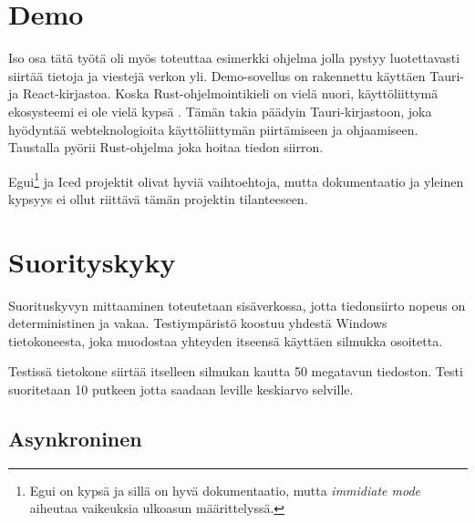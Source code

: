 \documentclass[a4paper,12pt]{article}
\begin{document}
    \section{Demo}\label{sec:demo}
    Iso osa tätä työtä oli myös toteuttaa esimerkki ohjelma jolla pystyy luotettavasti siirtää tietoja ja viestejä verkon yli. Demo-sovellus on rakennettu käyttäen Tauri- ja React-kirjastoa. Koska Rust-ohjelmointikieli on vielä nuori, käyttöliittymä ekosysteemi ei ole vielä kypsä \cite{AreYet}. Tämän takia päädyin Tauri-kirjastoon, joka hyödyntää webteknologioita käyttöliittymän piirtämiseen ja ohjaamiseen. Taustalla pyörii Rust-ohjelma joka hoitaa tiedon siirron. \par
    Egui\footnote{Egui on kypsä ja sillä on hyvä dokumentaatio, mutta \textit{immidiate mode} aiheutaa vaikeuksia ulkoasun määrittelyssä. } ja Iced projektit olivat hyviä vaihtoehtoja, mutta dokumentaatio ja yleinen kypsyys ei ollut riittävä tämän projektin tilanteeseen.

    \section{Suorityskyky}
    Suorituskyvyn mittaaminen toteutetaan sisäverkossa, jotta tiedonsiirto nopeus on deterministinen ja vakaa.
    Testiympäristö koostuu yhdestä Windows tietokoneesta, joka muodostaa yhteyden itseensä käyttäen silmukka osoitetta.\par
    Testissä tietokone siirtää itselleen silmukan kautta 50 megatavun tiedoston. Testi suoritetaan 10 putkeen jotta saadaan leville keskiarvo selville.

    \subsection{Asynkroninen}
    
    
\end{document}
